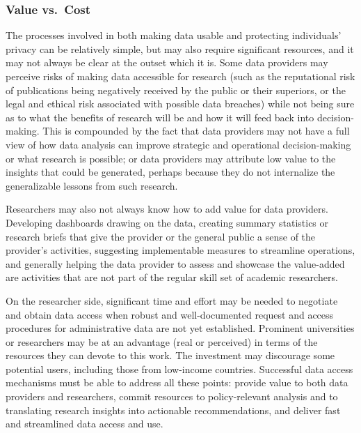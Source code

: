 \documentclass[
]{WileySix}
\begin{document}
\hypertarget{value-vs.-cost}{%
\subsubsection{Value vs.~Cost}\label{value-vs.-cost}}

The processes involved in both making data usable and protecting individuals' privacy can be relatively simple, but may also require significant resources, and it may not always be clear at the outset which it is. Some data providers may perceive risks of making data accessible for research (such as the reputational risk of publications being negatively received by the public or their superiors, or the legal and ethical risk associated with possible data breaches) while not being sure as to what the benefits of research will be and how it will feed back into decision-making. This is compounded by the fact that data providers may not have a full view of how data analysis can improve strategic and operational decision-making or what research is possible; or data providers may attribute low value to the insights that could be generated, perhaps because they do not internalize the generalizable lessons from such research.

Researchers may also not always know how to add value for data providers. Developing dashboards drawing on the data, creating summary statistics or research briefs that give the provider or the general public a sense of the provider's activities, suggesting implementable measures to streamline operations, and generally helping the data provider to assess and showcase the value-added are activities that are not part of the regular skill set of academic researchers.

On the researcher side, significant time and effort may be needed to negotiate and obtain data access when robust and well-documented request and access procedures for administrative data are not yet established. Prominent universities or researchers may be at an advantage (real or perceived) in terms of the resources they can devote to this work. The investment may discourage some potential users, including those from low-income countries. Successful data access mechanisms must be able to address all these points: provide value to both data providers and researchers, commit resources to policy-relevant analysis and to translating research insights into actionable recommendations, and deliver fast and streamlined data access and use.
\end{document}
